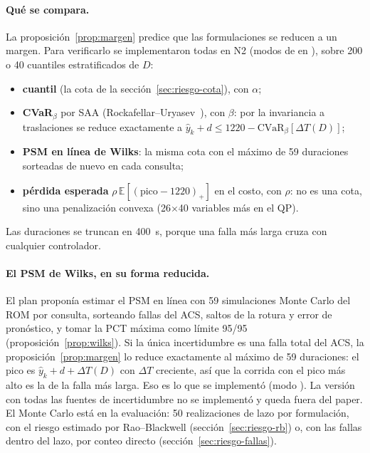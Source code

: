 \paragraph{Qué se compara.} La proposición~\ref{prop:margen} predice que las formulaciones se
reducen a un margen. Para verificarlo se implementaron todas en N2 (modos de  en
), sobre 200 o 40 cuantiles estratificados de $D$:
\begin{itemize}
  \item \textbf{cuantil} (la cota de la sección~\ref{sec:riesgo-cota}), con $\alpha$;
  \item \textbf{CVaR$_\beta$} por SAA (Rockafellar--Uryasev~\cite{rockafellar2000}), con $\beta$:
        por la invariancia a traslaciones se reduce exactamente a
        $\hat y_k+d\le1220-\mathrm{CVaR}_\beta[\Delta T(D)]$;
  \item \textbf{PSM en línea de Wilks}: la misma cota con el máximo de 59 duraciones
        sorteadas de nuevo en cada consulta;
  \item \textbf{pérdida esperada} $\rho\,\mathbb E[(\text{pico}-1220)_+]$ en el costo, con $\rho$:
        no es una cota, sino una penalización convexa (26$\times$40 variables más en el QP).
\end{itemize}
Las duraciones se truncan en 400~s, porque una falla más larga cruza con cualquier controlador.

\paragraph{El PSM de Wilks, en su forma reducida.} El plan proponía estimar el PSM en línea con 59
simulaciones Monte Carlo del ROM por consulta, sorteando fallas del ACS, saltos de la rotura y
error de pronóstico, y tomar la PCT máxima como límite 95/95 (proposición~\ref{prop:wilks}). Si la
única incertidumbre es una falla total del ACS, la proposición~\ref{prop:margen} lo reduce
exactamente al máximo de 59 duraciones: el pico es $\hat y_k+d+\Delta T(D)$ con $\Delta T$
creciente, así que la corrida con el pico más alto es la de la falla más larga. Eso es lo que se
implementó (modo ). La versión con todas las fuentes de incertidumbre no se
implementó y queda fuera del paper. El Monte Carlo está en la evaluación: 50 realizaciones de lazo
por formulación, con el riesgo estimado por Rao--Blackwell (sección~\ref{sec:riesgo-rb}) o, con
las fallas dentro del lazo, por conteo directo (sección~\ref{sec:riesgo-fallas}).

